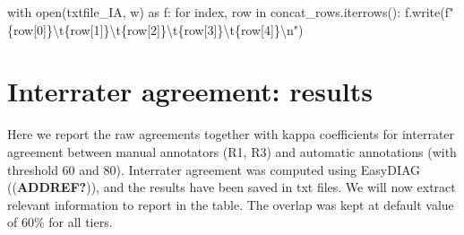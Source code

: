 \documentclass[
  letterpaper,
  DIV=11,
  numbers=noendperiod]{scrreprt}
\newenvironment{Shaded}{\begin{snugshade}}{\end{snugshade}}
\newcommand{\BuiltInTok}[1]{\textcolor[rgb]{0.00,0.23,0.31}{#1}}
\newcommand{\CharTok}[1]{\textcolor[rgb]{0.13,0.47,0.30}{#1}}
\newcommand{\ControlFlowTok}[1]{\textcolor[rgb]{0.00,0.23,0.31}{#1}}
\newcommand{\DecValTok}[1]{\textcolor[rgb]{0.68,0.00,0.00}{#1}}
\newcommand{\ImportTok}[1]{\textcolor[rgb]{0.00,0.46,0.62}{#1}}
\newcommand{\KeywordTok}[1]{\textcolor[rgb]{0.00,0.23,0.31}{#1}}
\newcommand{\NormalTok}[1]{\textcolor[rgb]{0.00,0.23,0.31}{#1}}
\newcommand{\SpecialCharTok}[1]{\textcolor[rgb]{0.37,0.37,0.37}{#1}}
\newcommand{\SpecialStringTok}[1]{\textcolor[rgb]{0.13,0.47,0.30}{#1}}
\newcommand{\StringTok}[1]{\textcolor[rgb]{0.13,0.47,0.30}{#1}}
\begin{document}
\begin{Shaded}
\begin{Highlighting}[]
    \ControlFlowTok{with} \BuiltInTok{open}\NormalTok{(txtfile\_IA, }\StringTok{\textquotesingle{}w\textquotesingle{}}\NormalTok{) }\ImportTok{as}\NormalTok{ f:}
        \ControlFlowTok{for}\NormalTok{ index, row }\KeywordTok{in}\NormalTok{ concat\_rows.iterrows():}
\NormalTok{            f.write(}\SpecialStringTok{f"}\SpecialCharTok{\{}\NormalTok{row[}\DecValTok{0}\NormalTok{]}\SpecialCharTok{\}}\CharTok{\textbackslash{}t}\SpecialCharTok{\{}\NormalTok{row[}\DecValTok{1}\NormalTok{]}\SpecialCharTok{\}}\CharTok{\textbackslash{}t}\SpecialCharTok{\{}\NormalTok{row[}\DecValTok{2}\NormalTok{]}\SpecialCharTok{\}}\CharTok{\textbackslash{}t}\SpecialCharTok{\{}\NormalTok{row[}\DecValTok{3}\NormalTok{]}\SpecialCharTok{\}}\CharTok{\textbackslash{}t}\SpecialCharTok{\{}\NormalTok{row[}\DecValTok{4}\NormalTok{]}\SpecialCharTok{\}}\CharTok{\textbackslash{}n}\SpecialStringTok{"}\NormalTok{)}
\end{Highlighting}
\end{Shaded}


\chapter{Interrater agreement:
results}\label{interrater-agreement-results}

Here we report the raw agreements together with kappa coefficients for
interrater agreement between manual annotators (R1, R3) and automatic
annotations (with threshold 60 and 80). Interrater agreement was
computed using EasyDIAG ((\textbf{ADDREF?})), and the results have been
saved in txt files. We will now extract relevant information to report
in the table. The overlap was kept at default value of 60\% for all
tiers.
\end{document}
